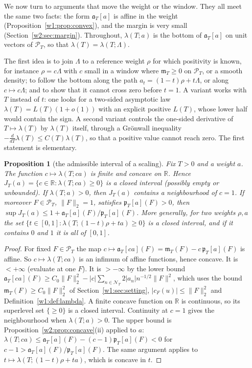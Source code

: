 \documentclass[11pt]{amsart}
\newtheorem{proposition}[theorem]{Proposition}
\theoremstyle{definition}
\theoremstyle{remark}
\numberwithin{equation}{section}
\newcommand{\R}{\mathbb{R}}
\newcommand{\cF}{c_F}                                  %
\newcommand{\PT}{\mathcal{P}_T}                        %
\newcommand{\NT}{\mathcal{N}_T}                        %
\newcommand{\mT}{\mathfrak{m}_T}                       %
\newcommand{\pT}{\mathfrak{p}_T}                       %
\newcommand{\aT}{\mathfrak{a}_T}                       %
\newcommand{\lam}{\lambda(T)}                          %
\begin{document}
We now turn to arguments that move the weight or the window. They all meet the same two facts: the form
$\aT[a]$ is affine in the weight (Proposition~\ref{w1:prop:convex}), and the margin is very small
(Section~\ref{w2:sec:margin}). Throughout, $\lambda(T;a)$ is the bottom of $\aT[a]$ on unit vectors of $\PT$, so
that $\lam=\lambda(T;\Lambda)$.

The first idea is to join $\Lambda$ to a reference weight $\rho$ for which positivity is known, for instance
$\rho=c\Lambda$ with $c$ small in a window where $\mT\ge0$ on $\PT$, or a smooth density; to follow the bottom
along the path $a_t=(1-t)\rho+t\Lambda$, or along $c\mapsto c\Lambda$; and to show that it cannot cross zero
before $t=1$. A variant works with $T$ instead of $t$: one looks for a two-sided asymptotic law
$\lam=L(T)(1+o(1))$ with an explicit positive $L(T)$, whose lower half would contain the sign. A second variant
controls the one-sided derivative of $T\mapsto\lam$ by $\lam$ itself, through a Gr\"onwall inequality
$-\frac{d}{dT}\lam\le C(T)\lam$, so that a positive value cannot reach zero. The first statement is elementary.

\begin{proposition}[the admissible interval of a scaling]\label{w8:prop:scaling}
Fix $T>0$ and a weight $a$. The function $c\mapsto\lambda(T;ca)$ is finite and concave on $\R$. Hence
$J_T(a)=\{c\in\R:\lambda(T;ca)\ge0\}$ is a closed interval (possibly empty or unbounded). If $\lambda(T;a)>0$, then
$J_T(a)$ contains a neighbourhood of $c=1$. If moreover $F\in\PT$, $\|F\|_2=1$, satisfies $\pT[a](F)>0$, then
$\sup J_T(a)\le 1+\aT[a](F)/\pT[a](F)$. More generally, for two weights $\rho,a$ the set
$\{t\in[0,1]:\lambda(T;(1-t)\rho+ta)\ge0\}$ is a closed interval, and if it contains $0$ and $1$ it is all of $[0,1]$.
\end{proposition}

\begin{proof}
For fixed $F\in\PT$ the map $c\mapsto\aT[ca](F)=\mT(F)-c\,\pT[a](F)$ is affine. So $c\mapsto\lambda(T;ca)$ is an
infimum of affine functions, hence concave. It is $<+\infty$ (evaluate at one $F$). It is $>-\infty$ by the lower bound
$\aT[ca](F)\ge C_0\|F\|_2^2-|c|\sum_{n\in\NT}2|a_n|n^{-1/2}\|F\|^2$, which uses the bound $\mT(F)\ge C_0\|F\|_2^2$ of Section~\ref{w1:sec:setting}, $|\cF(u)|\le\|F\|_2^2$ and
Definition~\ref{w1:def:lambda}. A finite concave function on $\R$ is continuous, so its superlevel set $\{\ge0\}$ is a
closed interval. Continuity at $c=1$ gives the neighbourhood when $\lambda(T;a)>0$. The upper bound is
Proposition~\ref{w2:prop:concave}(ii) applied to $a$:
$\lambda(T;ca)\le\aT[a](F)-(c-1)\pT[a](F)<0$ for $c-1>\aT[a](F)/\pT[a](F)$. The same argument applies to
$t\mapsto\lambda(T;(1-t)\rho+ta)$, which is concave in $t$.
\end{proof}
\end{document}

